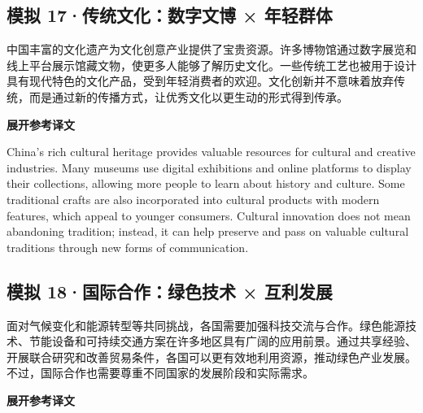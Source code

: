 \documentclass[a4paper,11pt,UTF8,fontset=none]{ctexart}
\begin{document}
\subsection{模拟 17·传统文化：数字文博 × 年轻群体}

\par

\noindent 中国丰富的文化遗产为文化创意产业提供了宝贵资源。许多博物馆通过数字展览和线上平台展示馆藏文物，使更多人能够了解历史文化。一些传统工艺也被用于设计具有现代特色的文化产品，受到年轻消费者的欢迎。文化创新并不意味着放弃传统，而是通过新的传播方式，让优秀文化以更生动的形式得到传承。\par

\noindent\colorbox{HeadBlue}{\strut {\bfseries 展开参考译文}}\par\vspace{1pt}

\noindent China’s rich cultural heritage provides valuable resources for cultural and creative industries. Many museums use digital exhibitions and online platforms to display their collections, allowing more people to learn about history and culture. Some traditional crafts are also incorporated into cultural products with modern features, which appeal to younger consumers. Cultural innovation does not mean abandoning tradition; instead, it can help preserve and pass on valuable cultural traditions through new forms of communication.\par

\vspace{4pt}

\subsection{模拟 18·国际合作：绿色技术 × 互利发展}

\par

\noindent 面对气候变化和能源转型等共同挑战，各国需要加强科技交流与合作。绿色能源技术、节能设备和可持续交通方案在许多地区具有广阔的应用前景。通过共享经验、开展联合研究和改善贸易条件，各国可以更有效地利用资源，推动绿色产业发展。不过，国际合作也需要尊重不同国家的发展阶段和实际需求。\par

\noindent\colorbox{HeadBlue}{\strut {\bfseries 展开参考译文}}\par\vspace{1pt}
\end{document}
